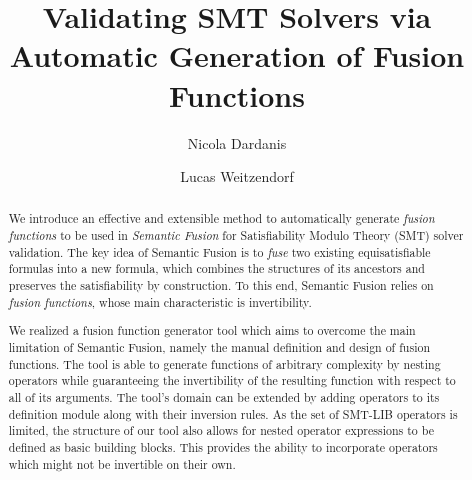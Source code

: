 \documentclass[sigplan,screen]{acmart}
\begin{document}
\title{Validating SMT Solvers via \\ Automatic Generation of Fusion Functions}

\author{Nicola Dardanis}

\author{Lucas Weitzendorf}
\authornotemark[1]



\renewcommand{\shortauthors}{Dardanis and Weitzendorf}

\begin{abstract}
  We introduce an effective and extensible method to automatically generate \textit{fusion functions} to be used in \textit{Semantic Fusion} for Satisfiability Modulo Theory (SMT) solver validation. The key idea of Semantic Fusion is to \textit{fuse} two existing equisatisfiable formulas into a new formula, which combines the structures of its ancestors and preserves the satisfiability by construction. To this end, Semantic Fusion relies on \textit{fusion functions}, whose main characteristic is invertibility.
  \par 
  We realized a fusion function generator tool which aims to overcome the main limitation of Semantic Fusion, namely the manual definition and design of fusion functions. The tool is able to generate functions of arbitrary complexity by nesting operators while guaranteeing the invertibility of the resulting function with respect to all of its arguments. The tool's domain can be extended by adding operators to its definition module along with their inversion rules. As the set of SMT-LIB operators is limited, the structure of our tool also allows for nested operator expressions to be defined as basic building blocks. This provides the ability to incorporate operators which might not be invertible on their own.
\end{abstract}
\end{document}
